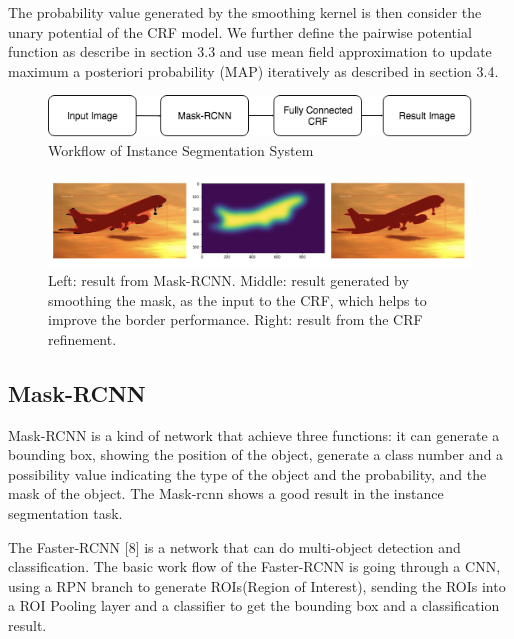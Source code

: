 \documentclass{article}
\begin{document}
The probability value generated by the smoothing kernel is then consider the unary potential of the CRF model. We further define the pairwise potential function as describe in section 3.3 and use mean field approximation to update maximum a posteriori probability (MAP) iteratively as described in section 3.4. 

\begin{figure}
  \centering
  \includegraphics[width=14cm]{Workflow.png}
  \caption{Workflow of Instance Segmentation System}
  \label{workflow}
\end{figure}

\begin{figure}
  \centering
  \includegraphics[width=14cm]{workflow.png}
  \caption{Left: result from Mask-RCNN. Middle: result generated by smoothing the mask, as the input to the CRF, which helps to improve the border performance. Right: result from the CRF refinement.}
  \label{workflow_image}
\end{figure}

\subsection{Mask-RCNN}

Mask-RCNN is a kind of network that achieve three functions: it can generate a bounding box, showing the position of the object, generate a class number and a possibility value indicating the type of the object and the probability, and the mask of the object. The Mask-rcnn shows a good result in the instance segmentation task.

The Faster-RCNN [8] is a network that can do multi-object detection and classification. The basic work flow of the Faster-RCNN is going through a CNN, using a RPN branch to generate ROIs(Region of Interest), sending the ROIs into a ROI Pooling layer and a classifier to get the bounding box and a classification result.
\end{document}
